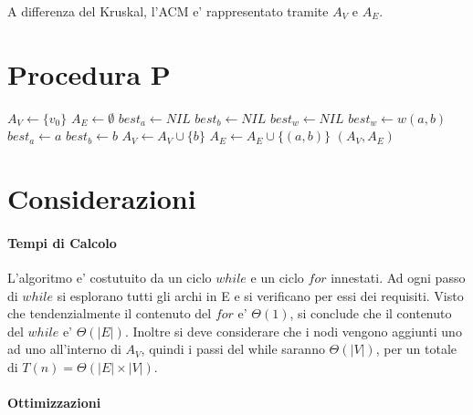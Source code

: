 A differenza del Kruskal, l'ACM e' rappresentato tramite $A_V$ e $A_E$.

\newpage

\section{Procedura P}

\begin{algorithm}
    \begin{algorithmic}
            \State $A_V \gets \{v_0\}$
            \State $A_E \gets \emptyset$
                \State $best_a \gets NIL$
                \State $best_b \gets NIL$
                \State $best_w \gets NIL$
                            \State $best_w \gets w(a, b)$
                            \State $best_a \gets a$
                            \State $best_b \gets b$
                        \EndIf
                    \EndIf
                \EndFor
                \State $A_V \gets A_V \cup \{b\}$
                \State $A_E \gets A_E \cup \{(a, b)\}$
            \EndWhile
            \State \Return $(A_V, A_E)$
        \EndProcedure
    \end{algorithmic}
\end{algorithm}

\section{Considerazioni}

\paragraph{Tempi di Calcolo}

L'algoritmo e' costutuito da un ciclo $while$ e un ciclo $for$ innestati. Ad ogni passo di $while$ si esplorano tutti gli archi in E e si verificano per essi dei requisiti.
Visto che tendenzialmente il contenuto del $for$ e' $\Theta(1)$, si conclude che il contenuto del $while$ e' $\Theta(|E|)$. 
Inoltre si deve considerare che i nodi vengono aggiunti uno ad uno all'interno di $A_V$, quindi i passi del while saranno $\Theta(|V|)$, per un totale di $T(n) = \Theta(|E| \times |V|)$. \\

\paragraph{Ottimizzazioni}


